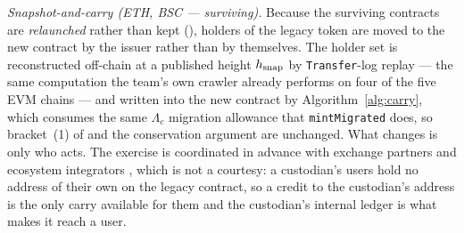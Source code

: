 \smallskip
\noindent\emph{Snapshot-and-carry (ETH, BSC --- surviving).} Because the surviving contracts are
\emph{relaunched} rather than kept (), holders of the legacy token are
moved to the new contract by the issuer rather than by themselves. The holder set is reconstructed
off-chain at a published height $h_{\mathrm{snap}}$ by \texttt{Transfer}-log replay --- the same
computation the team's own crawler already performs on four of the five EVM chains
 --- and written into the new contract by
Algorithm~\ref{alg:carry}, which consumes the same $\Lambda_c$ migration allowance that
\texttt{mintMigrated} does, so bracket~(1) of  and the conservation
argument are unchanged. What changes is only who acts. The exercise is coordinated in advance with
exchange partners and ecosystem integrators , which is not
a courtesy: a custodian's users hold no address of their own on the legacy contract, so a credit to
the custodian's address is the only carry available for them and the custodian's internal ledger is
what makes it reach a user.

